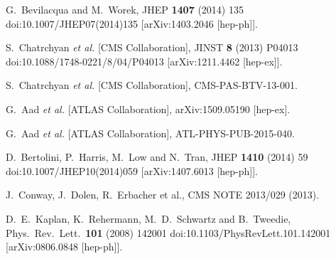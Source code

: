   G.~Bevilacqua and M.~Worek,
  JHEP {\bf 1407} (2014) 135
  doi:10.1007/JHEP07(2014)135
  [arXiv:1403.2046 [hep-ph]].
 
  S.~Chatrchyan {\it et al.} [CMS Collaboration],
  JINST {\bf 8} (2013) P04013
  doi:10.1088/1748-0221/8/04/P04013
  [arXiv:1211.4462 [hep-ex]].
  
  S.~Chatrchyan {\it et al.} [CMS Collaboration],
  CMS-PAS-BTV-13-001.
  
  G.~Aad {\it et al.} [ATLAS Collaboration],
  arXiv:1509.05190 [hep-ex].
  
  G.~Aad {\it et al.} [ATLAS Collaboration],
  ATL-PHYS-PUB-2015-040.
  
  D.~Bertolini, P.~Harris, M.~Low and N.~Tran,
  JHEP {\bf 1410} (2014) 59
  doi:10.1007/JHEP10(2014)059
  [arXiv:1407.6013 [hep-ph]].


  J.~Conway, J.~Dolen, R.~Erbacher et al.,
  CMS NOTE 2013/029 (2013).
  
  D.~E.~Kaplan, K.~Rehermann, M.~D.~Schwartz and B.~Tweedie,
  Phys.\ Rev.\ Lett.\  {\bf 101} (2008) 142001
  doi:10.1103/PhysRevLett.101.142001
  [arXiv:0806.0848 [hep-ph]].
  
